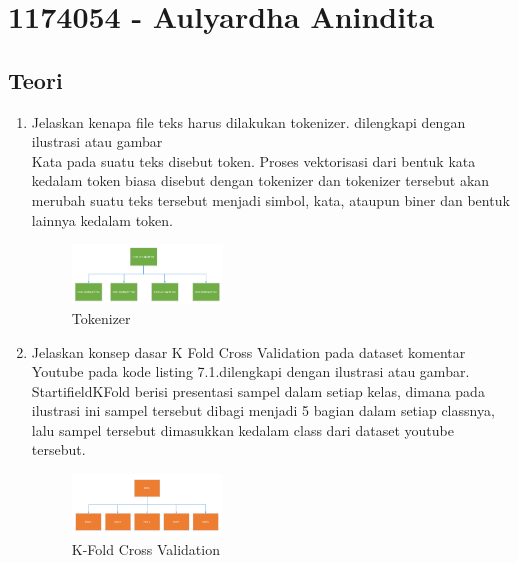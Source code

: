 \section{1174054 - Aulyardha Anindita}

\subsection{Teori}
\begin{enumerate}
\item Jelaskan kenapa file teks harus dilakukan tokenizer. dilengkapi dengan ilustrasi atau gambar\\
Kata pada suatu teks disebut token. Proses vektorisasi dari bentuk kata kedalam token biasa disebut dengan tokenizer dan tokenizer tersebut akan merubah suatu teks tersebut menjadi simbol, kata, ataupun biner dan bentuk lainnya kedalam token. 
\hfill\break
	\begin{figure}[H]
		\includegraphics[width=4cm]{figures/1174054/7/1.png}
		\centering
		\caption{Tokenizer}
	\end{figure}

\item Jelaskan konsep dasar K Fold Cross Validation pada dataset komentar Youtube pada kode listing 7.1.dilengkapi dengan ilustrasi atau gambar.\\
StartifieldKFold berisi presentasi sampel dalam setiap kelas, dimana pada ilustrasi ini sampel tersebut dibagi menjadi 5 bagian dalam setiap classnya, lalu sampel tersebut dimasukkan kedalam class dari dataset youtube tersebut.
\hfill\break
	\begin{figure}[H]
		\includegraphics[width=4cm]{figures/1174054/7/2.png}
		\centering
		\caption{K-Fold Cross Validation}
	\end{figure}


\end{enumerate}

